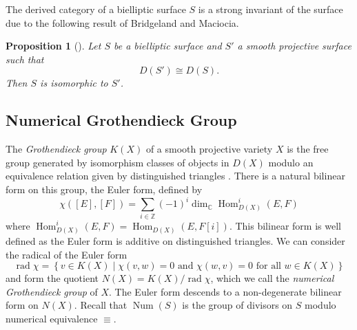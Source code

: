 \documentclass[a4paper, 12pt, twoside]{amsart}
\theoremstyle{plain}
\newtheorem{proposition}[theorem]{Proposition}
\theoremstyle{definition}
\DeclareMathOperator{\Hom}{Hom}
\DeclareMathOperator{\iso}{\cong}
\DeclareMathOperator{\num}{Num}
\DeclareMathOperator{\rad}{rad}
\begin{document}
The derived category of a bielliptic surface $S$ is a strong invariant
of the surface due to the following result of Bridgeland and Maciocia.

\begin{proposition}[{\cite[Proposition
    6.2]{MR1827500}}]\label{prop:beilliptic-FM-partners}
Let $S$ be a bielliptic surface and $S'$ a smooth projective surface such that 
\[
D(S') \iso D(S).
\]
Then $S$ is isomorphic to $S'$.
\end{proposition}

\subsection{Numerical Grothendieck Group}
\label{sec:numer-groth-group}

The \emph{Grothendieck group} \linebreak $K(X)$ of a smooth projective
variety $X$ is the free group generated by isomorphism classes of objects
in $D(X)$ modulo an equivalence relation given by distinguished
triangles \cite[\S 5]{MR2244106}. There is a natural bilinear form on
this group, the Euler form, defined by
\[
\chi([E],[F]) = \sum_{i \in \mathbb{Z}} (-1)^i \dim_{\mathbb{C}}\Hom_{D(X)}^i(E,F)
\]
where $\Hom^i_{D(X)}(E,F) = \Hom_{D(X)}(E,F[i])$. This bilinear form
is well defined as the Euler form is additive on distinguished
triangles. We can consider the radical of the Euler form
\[
  \rad \chi = \left\{ v \in K(X) \middle| \chi(v,w) =0
    \text{ and } \chi(w,v)= 0 \text{ for all } w \in K(X) \right\}
\]
and form the quotient $N(X) = K(X)/\rad \chi$, which we call the
\linebreak \emph{numerical Grothendieck group} of $X$. The Euler form
descends to a non-degenerate bilinear form on $N(X)$. Recall that
$\num(S)$ is the group of divisors on $S$ modulo numerical equivalence
$\equiv$.
\end{document}
